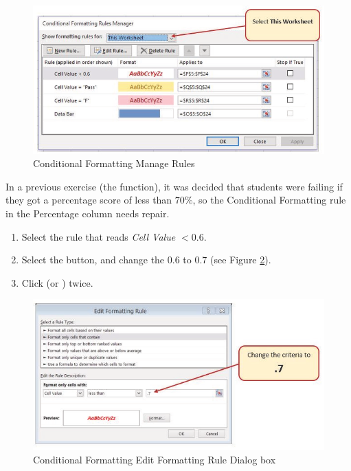 \begin{figure}[H]
	\centering
	\includegraphics[width=\maxwidth{.95\linewidth}]{gfx/ch03_fig23}
	\caption{Conditional Formatting Manage Rules}
	\label{03:fig23}
\end{figure}

In a previous exercise (the  function), it was decided that students were failing if they got a percentage score of less than $ 70\% $, so the Conditional Formatting rule in the Percentage column needs repair.

\begin{enumerate}[resume]
	\item Select the rule that reads \textit{Cell Value $ <0.6 $}.
	\item Select the  button, and change the $ 0.6 $ to $ 0.7 $ (see Figure \ref{03:fig24}).
	\item Click  (or ) twice.
\end{enumerate}

\begin{figure}[H]
	\centering
	\includegraphics[width=\maxwidth{.95\linewidth}]{gfx/ch03_fig24}
	\caption{Conditional Formatting Edit Formatting Rule Dialog box}
	\label{03:fig24}
\end{figure}

